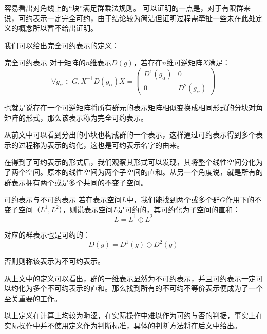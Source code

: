 容易看出对角线上的“块”满足群乘法规则。
可以证明的一点是，对于有限群来说，可约表示一定完全可约，由于结论较为简洁但证明过程需牵扯一些未在此处定义的概念所以暂不给出证明。

我们可以给出完全可约表示的定义：
\begin{definition}{完全可约表示}
对于矩阵的$n$维表示$D(g)$，若存在$n$维可逆矩阵$X$满足：
\begin{equation}
\forall g_\alpha\in G ,X^{-1}D(g_\alpha)X=
\begin{pmatrix}
 D^1(g_\alpha) & 0\\
 0 & D^2(g_\alpha)
\end{pmatrix}
\end{equation}

也就是说存在一个可逆矩阵将所有群元的表示矩阵相似变换成相同形式的分块对角矩阵的形式，那么该表示称为完全可约表示。
\end{definition}

从前文中可以看到分出的小块也构成群的一个表示，这样通过可约表示得到多个表示的过程称为表示的约化，这也是可约表示名字的由来。

在得到了可约表示的形式后，我们观察其形式可以发现，其将整个线性空间分化为了两个空间。原本的线性空间为两个子空间的直和。从另一个角度说，就是所有的群表示拥有两个或是多个共同的不变子空间。

\begin{definition}{可约表示与不可约表示}
若在表示空间$L$中，我们能找到两个或多个群$G$作用下的不变子空间（$L^1,L^2$），则说表示空间$L$是可约的，其可约化为子空间的直和：
$$L=L^1\oplus L^2$$

对应的群表示也是可约的：
$$D(g)=D^1(g)\oplus D^2(g)$$

否则则称该表示为不可约表示。
\end{definition}

从上文中的定义可以看出，群的一维表示显然为不可约表示，并且可约表示一定可以约化为多个不可约表示的直和。那么找到所有的不可约不等价表示便成为了一个至关重要的工作。

以上定义在计算上均较为晦涩，在实际操作中难以作为可约与否的判据，事实上在实际操作中并不使用定义作为判断标准，具体的判断方法将在后文中给出。